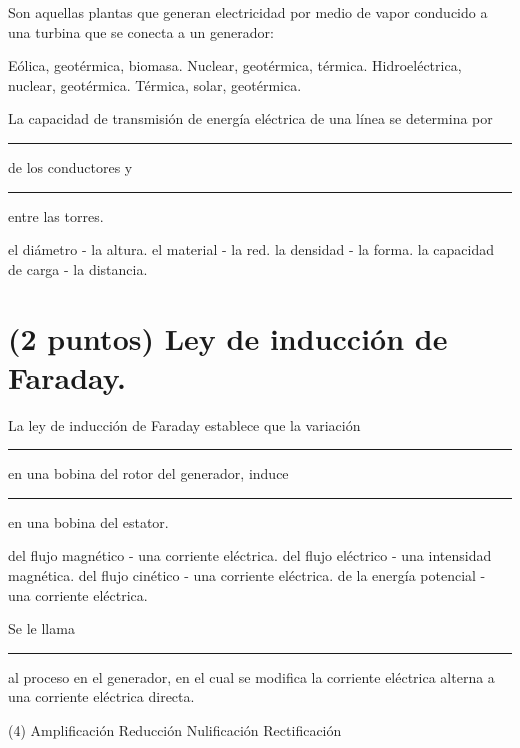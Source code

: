 \documentclass[12pt, letter]{exam}
\begin{document}
\begin{questions}
    \question Son aquellas plantas que generan electricidad por medio de vapor conducido a una turbina que se conecta a un generador:
    \begin{multicols}{2}
    \begin{tasks}
        \task Eólica, geotérmica, biomasa.
        \task Nuclear, geotérmica, térmica.
        \task Hidroeléctrica, nuclear, geotérmica.
        \task Térmica, solar, geotérmica.
    \end{tasks}
    \end{multicols}


    \question La capacidad de transmisión de energía eléctrica de una línea se determina por \rule{2cm}{0.1mm} de los conductores y \rule{2cm}{0.1mm} entre las torres.
    \begin{multicols}{2}
    \begin{tasks}
        \task el diámetro - la altura.
        \task el material - la red.
        \task la densidad - la forma.
        \task la capacidad de carga - la distancia.
    \end{tasks}
    \end{multicols}

    \section{(2 puntos) Ley de inducción de Faraday.}

    \question La ley de inducción de Faraday establece que la variación \rule{2cm}{0.1mm} en una bobina del rotor del generador, induce \rule{2cm}{0.1mm} en una bobina del estator.
    \begin{tasks}
        \task del flujo magnético - una corriente eléctrica.
        \task del flujo eléctrico - una intensidad magnética.
        \task del flujo cinético - una corriente eléctrica.
        \task de la energía potencial - una corriente eléctrica.
    \end{tasks}
    \question Se le llama \rule{2cm}{0.1mm} al proceso en el generador, en el cual se modifica la corriente eléctrica alterna a una corriente eléctrica directa.
    \begin{tasks}(4)
        \task Amplificación
        \task Reducción
        \task Nulificación
        \task Rectificación
    \end{tasks}


\end{questions}
\end{document}
